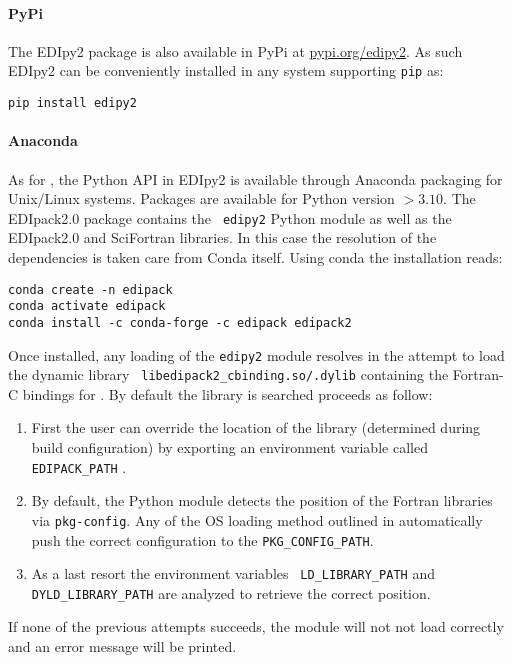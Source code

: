 \documentclass[edipack2.tex]{subfiles}
\begin{document}
\paragraph{PyPi}
The EDIpy2 package is also available in PyPi at
\href{https://pypi.org/project/edipy2/}{pypi.org/edipy2}. As such
EDIpy2 can be conveniently installed in any system supporting {\tt pip} as:

\begin{lstlisting}[style=mybash]
pip install edipy2
\end{lstlisting}


\paragraph{Anaconda}
As for \NAME, the Python API in EDIpy2 is available through
Anaconda packaging for Unix/Linux systems. Packages are available for
Python version $>3.10$. The EDIpack2.0 package contains the {\tt
  edipy2} Python module as well as the EDIpack2.0 and SciFortran
libraries. In this case the resolution of the dependencies is
taken care from Conda itself. 
Using conda the installation reads:
\begin{lstlisting}[style=mybash]
conda create -n edipack
conda activate edipack
conda install -c conda-forge -c edipack edipack2
\end{lstlisting}


Once installed, any loading of the {\tt edipy2} module resolves in the
attempt to load the dynamic library {\tt
  libedipack2\_cbinding.so/.dylib} containing the Fortran-C bindings
for \NAME. By default the library is searched proceeds as follow: 
\begin{enumerate}
\item First the user can override the location of the library
  (determined during \NAME build configuration) by exporting an
  environment variable called {\tt EDIPACK\_PATH} .
\item By default, the Python module detects the position of the
  Fortran libraries via {\tt pkg-config}. Any of the OS loading method
  outlined in  automatically push the
  correct configuration to the {\tt PKG\_CONFIG\_PATH}. 
\item As a last resort the environment variables {\tt
    LD\_LIBRARY\_PATH} and {\tt DYLD\_LIBRARY\_PATH} are analyzed to
  retrieve the correct position. 
\end{enumerate}
If none of the previous attempts succeeds, the module will not not load correctly and an error message will be printed. 
\end{document}
